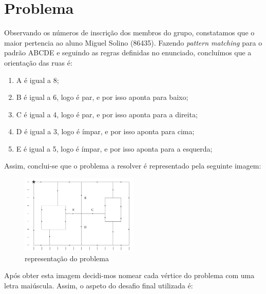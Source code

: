 \documentclass[a4paper]{report}
\begin{document}
\chapter{Problema}
Observando os números de inscrição dos membros do grupo, constatamos
que o maior pertencia ao aluno Miguel Solino (86435).
Fazendo \textit{pattern matching} para o padrão ABCDE e seguindo as
regras definidas no enunciado, concluímos que a orientação das ruas é:

\begin{enumerate}
    \item A é igual a 8;
    \item B é igual a 6, logo é par, e por isso aponta para baixo;
    \item C é igual a 4, logo é par, e por isso aponta para a direita;
    \item D é igual a 3, logo é ímpar, e por isso aponta para cima;
    \item E é igual a 5, logo é ímpar, e por isso aponta para a 
        esquerda;
\end{enumerate}

Assim, conclui-se que o problema a resolver é representado pela
seguinte imagem:

\begin{figure}[H]
    \begin{center}
        \includegraphics[width=0.5\textwidth]{images/desafio.png}\par
        \caption{representação do problema}
        \label{fig:problem}
    \end{center}
\end{figure}

Após obter esta imagem decidi-mos nomear cada vértice do problema com
uma letra maiúscula. Assim, o aspeto do desafio final utilizada é:
\end{document}
